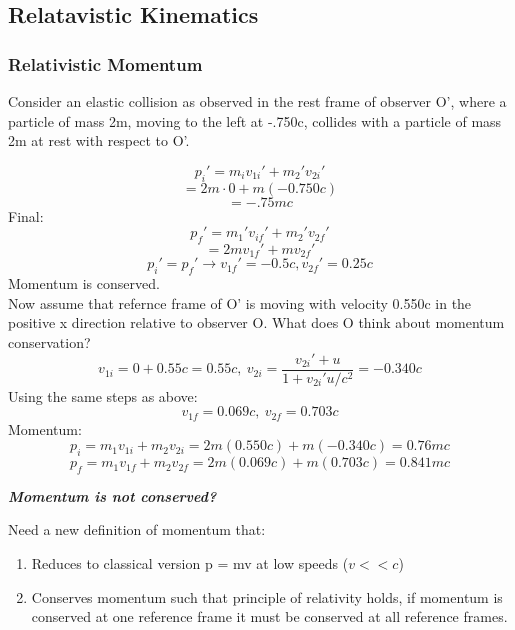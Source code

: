 \documentclass[class=article,crop=false]{standalone}
\begin{document}
\subsection{Relatavistic Kinematics}
\subsubsection{Relativistic Momentum}
Consider an elastic collision as observed in the rest frame of observer O', where a particle of mass 2m, moving to the left at -.750c, collides with a particle of mass 2m at rest with respect to O'. \\
\begin{question}
	$$p_i' = m_i v_{1i}' + m_2' v_{2i}' $$
	$$ = 2m \cdot 0 + m(-0.750c) $$
	$$ = -.75mc $$
	Final:
	$$ p_f' = m_1' v_{if}' + m_2' v_{2f}' $$
	$$ = 2m v_{1f}' + m v_{2f}' $$
	$$ p_i' = p_f' \rightarrow v_{1f}' = -0.5c, v_{2f}' = 0.25c $$
	Momentum is conserved. \\
	\bigskip
	Now assume that refernce frame of O' is moving with velocity 0.550c in the positive x direction relative to observer O. What does O think about momentum conservation? \\
	$$ v_{1i} = 0 + 0.55c = 0.55c,\ v_{2i} = \frac{v_{2i}' + u}{1 + v_{2i}' u/c^2} = -0.340 c $$
	Using the same steps as above: \\
	$$ v_{1f} = 0.069c,\ v_{2f} = 0.703c $$
	Momentum: \\
	$$ p_i = m_1 v_{1i} + m_2 v_{2i} = 2m(0.550c) + m(-0.340c) = 0.76mc $$
	$$ p_f = m_1 v_{1f} + m_2 v_{2f} = 2m(0.069c) + m(0.703c) = 0.841mc $$

	\textbf{\emph{Momentum is not conserved?}}
\end{question}
Need a new definition of momentum that: \\
\begin{enumerate}
	\item Reduces to classical version p = mv at low speeds ($v << c$)
	\item Conserves momentum such that principle of relativity holds, if momentum is conserved at one reference frame it must be conserved at all reference frames.
\end{enumerate}
\newpage
\end{document}

